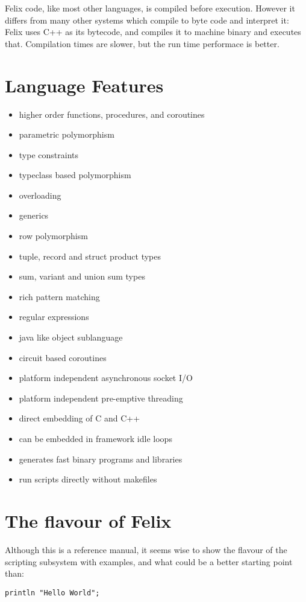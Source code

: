 \documentclass[oneside]{book}
\begin{document}
Felix code, like most other languages, is compiled before
execution. However it differs from many other systems which
compile to byte code and interpret it: Felix uses C++
as its bytecode, and compiles it to machine binary and
executes that. Compilation times are slower, but the
run time performace is better.

\chapter{Language Features}
\begin{itemize}
\item higher order functions, procedures, and coroutines
\item parametric polymorphism
\item type constraints
\item typeclass based \gls{polymorphism}
\item overloading
\item generics
\item row polymorphism
\item tuple, record and struct product types
\item sum, variant and union sum types
\item rich pattern matching
\item regular expressions
\item java like object sublanguage
\item circuit based \glspl{coroutine}
\item platform independent asynchronous socket I/O
\item platform independent pre-emptive threading
\item direct embedding of C and C++
\item can be embedded in framework idle loops
\item generates fast binary programs and libraries
\item run scripts directly without makefiles
\end{itemize}

\chapter{The flavour of Felix}
Although this is a reference manual, it seems wise to show
the flavour of the scripting subsystem with examples, and
what could be a better starting point than:

\begin{verbatim}
println "Hello World";
\end{verbatim}
\end{document}
